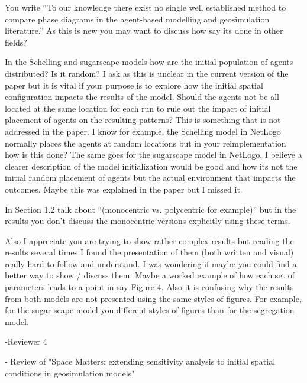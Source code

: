 \documentclass[11pt,a4paper,sans]{moderncv}        %
\begin{document}
 

You write “To our knowledge there exist no single well established method to compare phase diagrams in the agent-based modelling and geosimulation literature.” As this is new you may want to discuss how say its done in other fields?  

 

 

In the Schelling and sugarscape models how are the initial population of agents distributed? Is it random? I ask as this is unclear in the current version of the paper but it is vital if your purpose is to explore how the initial spatial configuration impacts the results of the model. Should the agents not be all located at the same location for each run to rule out the impact of initial placement of agents on the resulting patterns? This is something that is not addressed in the paper. I know for example, the Schelling model in NetLogo normally places the agents at random locations but in your reimplementation how is this done? The same goes for the sugarscape model in NetLogo. I believe a clearer description of the model initialization would be good and how its not the initial random placement of agents but the actual environment that impacts the outcomes. Maybe this was explained in the paper but I missed it.  

 

 

In Section 1.2 talk about “(monocentric vs. polycentric for example)” but in the results you don’t discuss the monocentric versions explicitly using these terms.

 

 

Also I appreciate you are trying to show rather complex results but reading the results several times I found the presentation of them (both written and visual) really hard to follow and understand. I was wondering if maybe you could find a better way to show / discuss them. Maybe a  worked example of how each set of parameters leads to a point in say Figure 4. Also it is confusing why the results from both models are not presented using the same styles of figures. For example, for the sugar scape model you different styles of figures than for the segregation model.   




-Reviewer 4

  -
Review of "Space Matters: extending sensitivity analysis to initial spatial conditions in geosimulation models"
\end{document}
